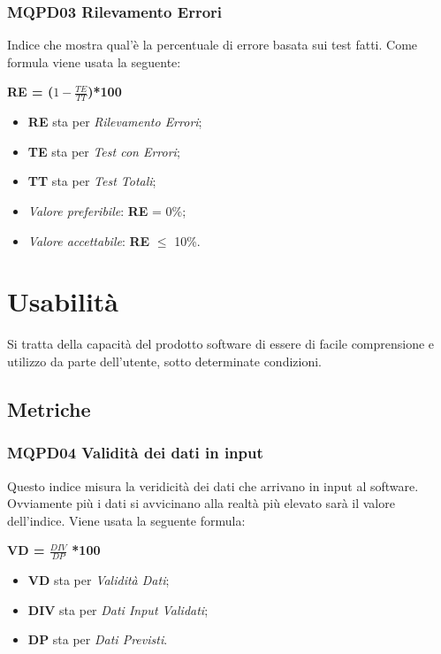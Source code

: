 \subsubsection{MQPD03 Rilevamento Errori} \label{QualitàDelProdottoAffidabilitàMetricheMQPD03}
Indice che mostra qual’è la percentuale di errore basata sui test fatti. Come formula viene usata la seguente:
\begin{center}
	\textbf{RE = ($1-\frac{TE}{TT}$)*100}
\end{center}
\begin{itemize}
	\item \textbf{RE} sta per \textit{Rilevamento Errori};
	\item \textbf{TE} sta per \textit{Test con Errori};
	\item \textbf{TT} sta per \textit{Test Totali};
	\item \textit{Valore preferibile}: \textbf{RE} = 0\%;
	\item \textit{Valore accettabile}: \textbf{RE} $\leq$ 10\%.
\end{itemize}

\section{Usabilità}\label{QualitàDelProdottoUsabilità}
Si tratta della capacità del prodotto software di essere di facile comprensione e utilizzo da parte dell’utente, sotto determinate condizioni.
\subsection{Metriche} \label{QualitàDelProdottoUsabilitàMetriche}
\subsubsection{MQPD04 Validità dei dati in input} \label{QualitàDelProdottoUsabilitàMetricheMQPD04}
Questo indice misura la veridicità dei dati che arrivano in input al software. Ovviamente più i dati si avvicinano alla realtà più elevato sarà il valore dell’indice.
Viene usata la seguente formula:
\begin{center}
	\textbf{VD = $\frac{DIV}{DP}$ *100}
\end{center}
\begin{itemize}
	\item \textbf{VD} sta per \textit{Validità Dati};
	\item \textbf{DIV} sta per \textit{Dati Input Validati};
	\item \textbf{DP} sta per \textit{Dati Previsti}.
\end{itemize}


